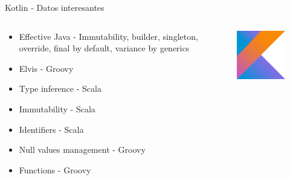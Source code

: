 \documentclass[aspectratio=169]{beamer}
\begin{document}
\begin{frame}{Kotlin - Datos interesantes}
\begin{columns}
\begin{column}{0.5\textwidth}
	\begin{itemize}
		\item Effective Java - Immutability, builder, singleton, override, final by default, variance by generics
		\item Elvis - Groovy 
		\item Type inference - Scala
		\item Immutability - Scala
		\item Identifiers - Scala
		\item Null values management - Groovy
		\item Functions - Groovy
	\end{itemize}
\end{column}
\begin{column}{0.5\textwidth}  %
	\begin{figure}
		\centering
		\includegraphics[width=0.7\linewidth]{Images/kotlin}
	\end{figure}
\end{column}
\end{columns}
\end{frame}
\end{document}
